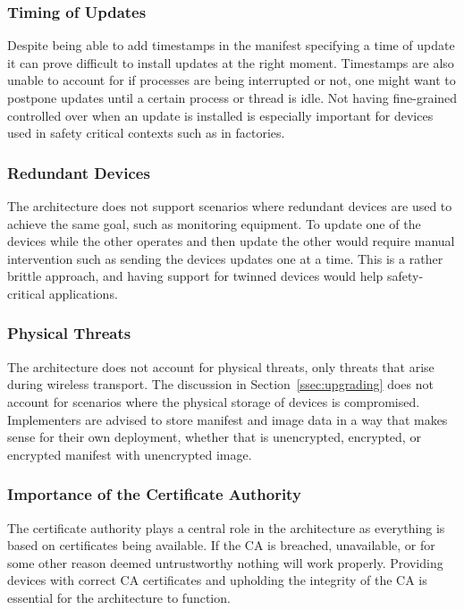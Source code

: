 \documentclass[0-thesis.tex]{subfiles}
\begin{document}
\subsubsection{Timing of Updates}
Despite being able to add timestamps in the manifest specifying a time of update it can
prove difficult to install updates at the right moment. Timestamps are also unable to
account for if processes are being interrupted or not, one might want to postpone updates
until a certain process or thread is idle. Not having fine-grained controlled over when an
update is installed is especially important for devices used in safety critical contexts
such as in factories.

\subsubsection{Redundant Devices}
The architecture does not support scenarios where redundant devices are used to achieve
the same goal, such as monitoring equipment. To update one of the devices while the other
operates and then update the other would require manual intervention such as sending the
devices updates one at a time. This is a rather brittle approach, and having support for
twinned devices would help safety-critical applications.

\subsubsection{Physical Threats}
The architecture does not account for physical threats, only threats that arise during
wireless transport. The discussion in Section~\ref{ssec:upgrading} does not account for
scenarios where the physical storage of devices is compromised. Implementers are advised
to store manifest and image data in a way that makes sense for their own deployment,
whether that is unencrypted, encrypted, or encrypted manifest with unencrypted image.

\subsubsection{Importance of the Certificate Authority}
The certificate authority plays a central role in the architecture as everything is based
on certificates being available. If the CA is breached, unavailable, or for some other
reason deemed untrustworthy nothing will work properly. Providing devices with correct CA
certificates and upholding the integrity of the CA is essential for the architecture to
function.
\end{document}
